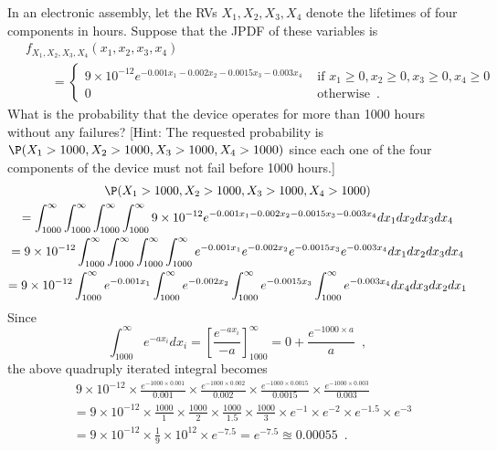 \begin{ExerciseList}
\Exercise
In an electronic assembly, let the RVs $X_1,X_2,X_3,X_4$ denote the lifetimes of four components in hours.  
Suppose that the JPDF of these variables is
\begin{align*}
~& f_{X_1,X_2,X_3,X_4}(x_1,x_2,x_3,x_4) \\
&\qquad= 
\begin{cases}
9 \times 10^{-12} e^{-0.001 x_1 - 0.002 x_2 - 0.0015 x_3 - 0.003 x_4} & \text{ if } x_1 \geq 0, x_2 \geq 0, x_3 \geq 0, x_4 \geq 0\\
0 & \text{ otherwise} \enspace.
\end{cases}
\end{align*}
What is the probability that the device operates for more than 1000 hours without any failures? [Hint: The requested probability is $\P(X_1>1000,X_2>1000,X_3>1000,X_4>1000)$ since each one of the four components of the device must not fail before 1000 hours.]
\Answer
~\\
\begin{multline*}
\P(X_1>1000,X_2>1000,X_3>1000,X_4>1000) \\
= \int_{1000}^{\infty} \int_{1000}^{\infty} \int_{1000}^{\infty} \int_{1000}^{\infty} 9 \times 10^{-12} e^{-0.001 x_1 - 0.002 x_2 - 0.0015 x_3 - 0.003 x_4} dx_1 dx_2 dx_3 dx_4\\
= 9 \times 10^{-12} \int_{1000}^{\infty} \int_{1000}^{\infty} \int_{1000}^{\infty} \int_{1000}^{\infty}  e^{-0.001 x_1} e^{- 0.002 x_2} e^{- 0.0015 x_3} e^{- 0.003 x_4} dx_1 dx_2 dx_3 dx_4\\
=  9 \times 10^{-12} \int_{1000}^{\infty} e^{-0.001 x_1} \int_{1000}^{\infty} e^{- 0.002 x_2} \int_{1000}^{\infty} e^{- 0.0015 x_3} \int_{1000}^{\infty} e^{- 0.003 x_4} dx_4 dx_3 dx_2 dx_1\\
\end{multline*}
Since
\[
\int_{1000}^{\infty} e^{- a x_i} dx_i = \left[ \frac{e^{-a x_i}}{-a} \right]_{1000}^{\infty} = 0 + \frac{e^{-1000\times a}}{a} \enspace ,
\]
the above quadruply iterated integral becomes
\begin{align*}
&~ 9 \times 10^{-12} \times \frac{e^{-1000 \times 0.001}}{0.001} \times \frac{e^{-1000 \times 0.002}}{0.002} 
\times \frac{e^{-1000 \times 0.0015}}{0.0015} \times \frac{e^{-1000 \times 0.003}}{0.003}\\
&= 9 \times 10^{-12} \times \frac{1000}{1} \times \frac{1000}{2} \times \frac{1000}{1.5} \times \frac{1000}{3} \times
e^{-1} \times e^{-2} \times e^{-1.5} \times e^{-3} \\
&= 9 \times 10^{-12} \times \frac{1}{9} \times 10^{12} \times e^{-7.5} = e^{-7.5} \approxeq 0.00055 \enspace .
\end{align*}


\end{ExerciseList}
